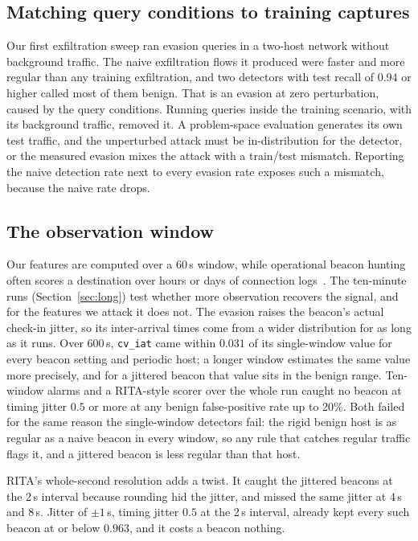 \documentclass[preprint,12pt]{elsarticle}
\begin{document}
\subsection{Matching query conditions to training captures}
Our first exfiltration sweep ran evasion queries in a two-host network without background traffic. The
naive exfiltration flows it produced were faster and more regular than any training exfiltration, and
two detectors with test recall of 0.94 or higher called most of them benign. That is an evasion at zero
perturbation, caused by the query conditions. Running queries inside the training scenario, with its
background traffic, removed it. A problem-space evaluation generates its own test traffic, and the
unperturbed attack must be in-distribution for the detector, or the measured evasion mixes the attack
with a train/test mismatch. Reporting the naive detection rate next to every evasion rate exposes such
a mismatch, because the naive rate drops.

\subsection{The observation window}
\label{sec:window}
Our features are computed over a 60\,s window, while operational beacon hunting often scores a
destination over hours or days of connection logs~\cite{gardiner2014}. The ten-minute runs
(Section~\ref{sec:long}) test whether more observation recovers the signal, and for the features we
attack it does not. The evasion raises the beacon's actual check-in jitter, so its inter-arrival times
come from a wider distribution for as long as it runs. Over 600\,s, \texttt{cv\_iat} came within
$0.031$ of its single-window value for every beacon setting and periodic host; a longer window estimates
the same value more precisely, and for a jittered beacon that value sits in the benign range. Ten-window
alarms and a RITA-style scorer over the whole run caught no beacon at timing jitter $0.5$ or more at
any benign false-positive rate up to 20\%. Both failed for the same reason the single-window detectors
fail: the rigid benign host is as regular as a naive beacon in every window, so any rule that catches
regular traffic flags it, and a jittered beacon is less regular than that host.

RITA's whole-second resolution adds a twist. It caught the jittered beacons at the 2\,s interval because
rounding hid the jitter, and missed the same jitter at 4\,s and 8\,s. Jitter of $\pm1$\,s, timing jitter
$0.5$ at the 2\,s interval, already kept every such beacon at or below $0.963$, and it costs a beacon
nothing.
\end{document}
